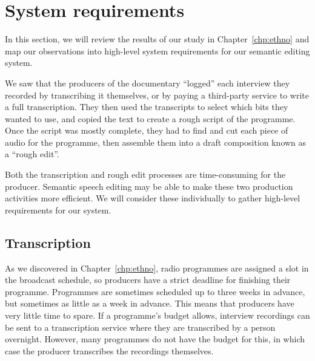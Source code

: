 
\section{System requirements}\label{sec:screen-requirements}


In this section, we will review the results of our study in Chapter~\ref{chp:ethno} and map our observations into
high-level system requirements for our semantic editing system.

We saw that the producers of the documentary ``logged'' each interview they recorded by transcribing it themselves, or
by paying a third-party service to write a full transcription.  They then used the transcripts to select which bits
they wanted to use, and copied the text to create a rough script of the programme. Once the script was mostly complete,
they had to find and cut each piece of audio for the programme, then assemble them into a draft composition known as a
``rough edit''.

Both the transcription and rough edit processes are time-consuming for the producer. Semantic speech
editing may be able to make these two production activities more efficient. We will consider these
individually to gather high-level requirements for our system.

\subsection{Transcription}
As we discovered in Chapter~\ref{chp:ethno}, radio programmes are assigned a slot in the broadcast schedule, so
producers have a strict deadline for finishing their programme. Programmes are sometimes scheduled up to three
weeks in advance, but sometimes as little as a week in advance.  This means that producers have very little time to
spare. If a programme's budget allows, interview recordings can be sent to a transcription service where they are
transcribed by a person overnight. However, many programmes do not have the budget for this, in which case the producer
transcribes the recordings themselves.

